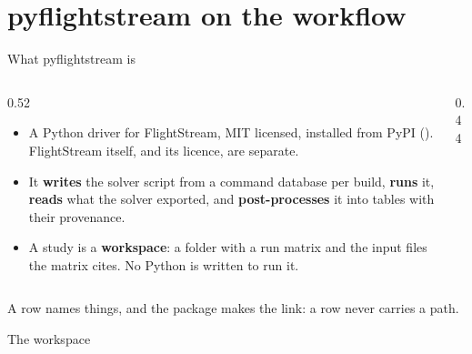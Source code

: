 %
%

\section{pyflightstream on the workflow}

\begin{frame}{What pyflightstream is}
\begin{columns}[T]
\begin{column}{0.52\textwidth}
\begin{itemize}\small
  \item A Python driver for FlightStream, MIT licensed, installed from PyPI
        (). FlightStream itself, and its
        licence, are separate.
  \item It \textbf{writes} the solver script from a command database per
        build, \textbf{runs} it, \textbf{reads} what the solver exported, and
        \textbf{post-processes} it into tables with their provenance.
  \item A study is a \textbf{workspace}: a folder with a run matrix and the
        input files the matrix cites. No Python is written to run it.
\end{itemize}
\end{column}
\begin{column}{0.44\textwidth}
\end{column}
\end{columns}
\begin{takeaway}A row names things, and the package makes the link: a row never
carries a path.\end{takeaway}
\end{frame}

\begin{frame}{The workspace}
\end{frame}

